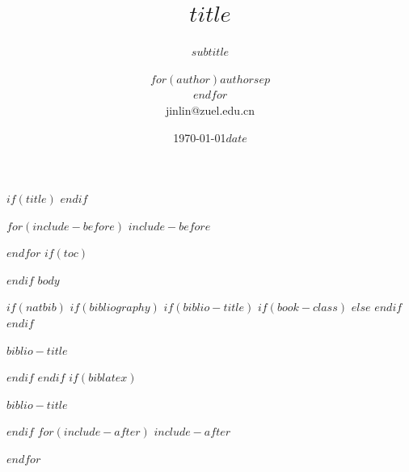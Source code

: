 \documentclass[$if(fontsize)$$fontsize$,$endif$$if(lang)$$babel-lang$,$endif$$if(handout)$handout,$endif$$if(beamer)$ignorenonframetext,11pt,xcolor=dvipsnames,hyperref={colorlinks,allcolors=.,urlcolor=blue, citecolor=violet, bookmarksdepth=4},$endif$$for(classoption)$$classoption$$sep$,$endfor$]{$documentclass$}
\author[$for(author)$$author$$sep$ \\ $endfor$]{\CJKfamily{kai}$for(author)$$author$$sep$ \\ $endfor$ \\ jinlin@zuel.edu.cn \\}
\institute[$for(institute)$$institute$$sep$ \and $endfor$]{\normalsize\CJKfamily{kai}$for(institute)$$institute$$sep$ \and $endfor$}
\date{\today}
\date{$date$}
\title{$title$}
\subtitle{$subtitle$}
\renewcommand{\refname}{参考文献}            %
\begin{document}
$if(title)$
\frame{\titlepage}
$endif$

$for(include-before)$
$include-before$

$endfor$
$if(toc)$
\begin{frame}
\tableofcontents[hideallsubsections]
\end{frame}

$endif$
$body$

$if(natbib)$
$if(bibliography)$
$if(biblio-title)$
$if(book-class)$
\renewcommand\bibname{$biblio-title$}
$else$
\renewcommand\refname{$biblio-title$}
$endif$
$endif$
\begin{frame}[allowframebreaks]{$biblio-title$}
\footnotesize{}

\end{frame}

$endif$
$endif$
$if(biblatex)$
\begin{frame}[allowframebreaks]{$biblio-title$}
\footnotesize{}
\printbibliography[heading=none]
\end{frame}

$endif$
$for(include-after)$
$include-after$

$endfor$
\end{document}
